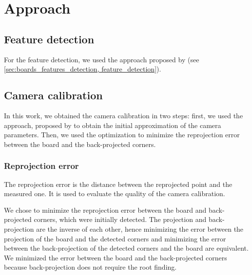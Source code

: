 \chapter{Approach}\label{cha:approach}

\section{Feature detection}\label{sec:feature_detection}

For the feature detection, we used the approach proposed by
\cite{geigerAutomaticCameraRange2012} (see \cref{sec:boards_features_detection,
	feature_detection}).

\section{Camera calibration}\label{sec:camera_calibration}

In this work, we obtained the camera calibration in two steps: first, we
used the approach, proposed by \cite{scaramuzzaToolboxEasilyCalibrating2006} to
obtain the initial approximation of the camera parameters. Then, we used the
optimization to minimize the reprojection error between the board and the
back-projected corners.

\subsection{Reprojection error}\label{sub:reprojection_error}

The reprojection error is the distance between the reprojected point and the
measured one. It is used to evaluate the quality of the camera calibration.

We chose to minimize the reprojection error between the board and back-projected
corners, which were initially detected. The projection and back-projection are
the inverse of each other, hence minimizing the error between the projection of
the board and the detected corners and minimizing the error between the
back-projection of the detected corners and the board are
equivalent. We minimized the error
between the board and the back-projected corners because back-projection does
not require the root finding.

